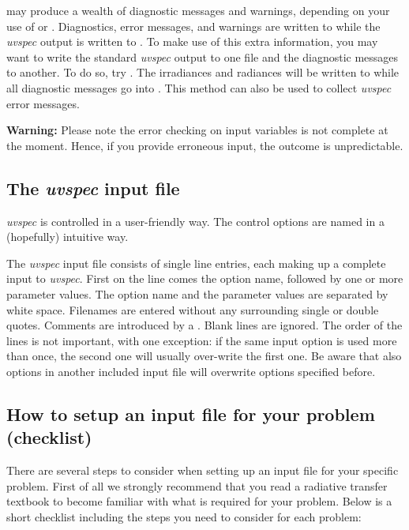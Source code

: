  may produce a wealth of diagnostic
messages and warnings, depending on your use of  or
.  Diagnostics, error messages, and warnings are written
to  while the {\sl uvspec} output is written to
. To make use of this extra information, you may want to
write the standard {\sl uvspec} output to one file and the diagnostic
messages to another. To do so, try . The irradiances and radiances will be
written to  while all diagnostic messages go into
. This method can also be used to collect
{\sl uvspec} error messages.

{\bf Warning:} Please note the error checking on input variables is
not complete at the moment. Hence, if you provide erroneous input, the
outcome is unpredictable.

\subsection{The {\sl uvspec} input file}

{\sl uvspec}
is controlled in a user-friendly way. The control options are named in
a (hopefully) intuitive way. 

The {\sl uvspec} input file consists of single line entries, each
making up a complete input to {\sl uvspec}. First on the
line comes the option name, followed by one or more parameter
values. The option name and the parameter values are separated by
white space.  Filenames are entered without any surrounding single or
double quotes.  Comments are introduced by a \code{\#}. Blank lines
are ignored. The order of the lines is not important, with one
exception: if the same input option is used more than once, the second
one will usually over-write the first one. Be aware that also options
in another included input file will overwrite options specified
before.


\subsection{How to setup an input file for your problem (checklist)}

There are several steps to consider when setting up an input file for
your specific problem. First of all we strongly recommend that you
read a radiative transfer textbook to become familiar with what is
required for your problem. Below is a short checklist including the
steps you need to consider for each problem:

